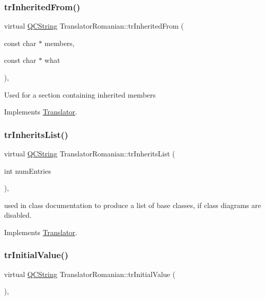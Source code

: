 \subsubsection{\texorpdfstring{trInheritedFrom()}{trInheritedFrom()}}
{\footnotesize\ttfamily virtual \mbox{\hyperlink{class_q_c_string}{Q\+C\+String}} Translator\+Romanian\+::tr\+Inherited\+From (\begin{DoxyParamCaption}\item[{const char $\ast$}]{members,  }\item[{const char $\ast$}]{what }\end{DoxyParamCaption})\hspace{0.3cm}{\ttfamily [inline]}, {\ttfamily [virtual]}}

Used for a section containing inherited members 

Implements \mbox{\hyperlink{class_translator}{Translator}}.

\mbox{\label{class_translator_romanian_a50b6364da29bc65928fb94ab06dafc8c}} 
\subsubsection{\texorpdfstring{trInheritsList()}{trInheritsList()}}
{\footnotesize\ttfamily virtual \mbox{\hyperlink{class_q_c_string}{Q\+C\+String}} Translator\+Romanian\+::tr\+Inherits\+List (\begin{DoxyParamCaption}\item[{int}]{num\+Entries }\end{DoxyParamCaption})\hspace{0.3cm}{\ttfamily [inline]}, {\ttfamily [virtual]}}

used in class documentation to produce a list of base classes, if class diagrams are disabled. 

Implements \mbox{\hyperlink{class_translator}{Translator}}.

\mbox{\label{class_translator_romanian_a0e7c7af257a232113d6f1e1f1bbc9500}} 
\subsubsection{\texorpdfstring{trInitialValue()}{trInitialValue()}}
{\footnotesize\ttfamily virtual \mbox{\hyperlink{class_q_c_string}{Q\+C\+String}} Translator\+Romanian\+::tr\+Initial\+Value (\begin{DoxyParamCaption}{ }\end{DoxyParamCaption})\hspace{0.3cm}{\ttfamily [inline]}, {\ttfamily [virtual]}}

